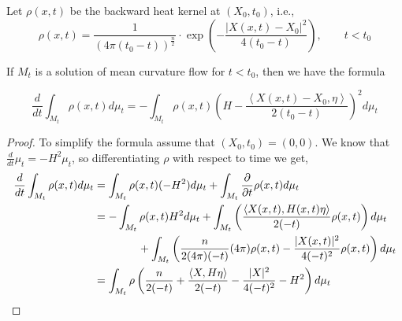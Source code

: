 Let $ \rho(x,t) $ be the backward heat kernel at $ (X_{0},t_{0}) $, i.e.,   \[\rho(x,t) = \frac{1}{(4 \pi (t_{0}-t))^{ \frac{n}{2}} }\cdot \exp\left( - \frac{|X(x,t)-X_{0}|^{2}}{4(t_{0}-t)} \right), \qquad t<t_{0} \]
\begin{thm}
If $ M_{t} $ is a solution of mean curvature flow for $ t< t_{0} $, then we have the formula

    \[ \frac{d}{dt} \int_{M_{t}}\rho(x,t)d \mu_{t}  = - \int_{M_{t}}\rho(x,t)\left( H- \frac{\left< X(x,t)-X_{0}, \eta \right>}{2 (t_{0}-t)} \right)^{2}d \mu_{t}\] 

\end{thm}
\begin{proof}
To simplify the formula assume that $ \left(X_{0},t_{0}\right) = (0,0) $. We know that $ \frac{d}{dt} \mu_{t} = -H^{2} \mu_{t} $, so differentiating $ \rho $ with respect to time we get,
\begin{align}
    \frac{d}{dt} \int_{M_{t}}\rho(x,t)d \mu_{t}  &= \int_{M_{t}}\rho(x,t)(-H^{2})d \mu_{t} + \int_{M_{t}} \frac{\partial}{\partial t}\rho(x,t)d \mu_{t}\nonumber \\
    & = -\int_{M_{t}}\rho(x,t)H^{2}d \mu_{t} +\int_{M_{t}}\left( \frac{\left< X(x,t), H(x,t)\eta \right>}{2(-t)}\rho(x,t) \right)d\mu_{t}\nonumber \\
    &  \qquad \qquad  + \int_{M_{t}} \left( \frac{n}{2(4 \pi)(-t)}(4 \pi)\rho(x,t) -\frac{|X(x,t)|^{2}}{4(-t)^{2}}\rho(x,t)\right)d \mu_{t}\nonumber \\ 
    & = \int_{M_{t}}\rho\left(   \frac{n}{2(-t)} +\frac{\left< X,H \eta\right>}{2(-t)}- \frac{|X|^{2}}{4(-t)^{2}} -H^{2}\right)d \mu_{t}\label{rho0}
\end{align}


\end{proof}

